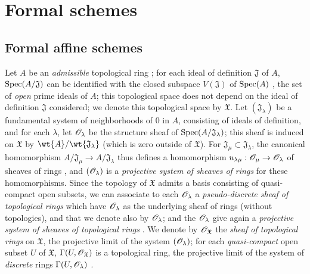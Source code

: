 \section{Formal schemes}
\label{section:1.10}

\subsection{Formal affine schemes}
\label{subsection:1.10.1}

\begin{env}[10.1.1]
\label{1.10.1.1}
Let $A$ be an \emph{admissible} topological ring ; for each ideal of definition $\mathfrak{J}$ of $A$, $\operatorname{Spec}(A/\mathfrak{J})$ can be identified with the closed subspace $V(\mathfrak{J})$ of $\operatorname{Spec}(A)$ , the set of \emph{open} prime ideals of $A$; this topological space does not depend
on the ideal of definition $\mathfrak{J}$ considered; we denote this topological space by $\mathfrak{X}$. Let $(\mathfrak{J}_\lambda)$ be a fundamental system of neighborhoods of $0$ in $A$, consisting of ideals of definition, and for each $\lambda$, let $\mathscr{O}_\lambda$ be the structure sheaf of $\operatorname{Spec}(A/\mathfrak{J}_\lambda)$; this sheaf is induced on $\mathfrak{X}$ by $\wt{A}/\wt{\mathfrak{J}_\lambda}$ (which is zero outside of $\mathfrak{X}$).
For $\mathfrak{J}_\mu\subset\mathfrak{J}_\lambda$, the canonical homomorphism $A/\mathfrak{J}_\mu\to A/\mathfrak{J}_\lambda$ thus defines a homomorphism $u_{\lambda\mu}:\sh{O}_\mu\to\sh{O}_\lambda$ of sheaves of rings , and $(\mathscr{O}_\lambda)$ is a \emph{projective system of sheaves of rings} for these homomorphisms.
Since the topology of $\mathfrak{X}$ admits a basis consisting of quasi-compact open subsets, we can associate to each $\mathscr{O}_\lambda$ a \emph{pseudo-discrete sheaf of topological rings}  which have $\mathscr{O}_\lambda$ as the underlying sheaf of rings (without topologies), and that we denote also by $\mathscr{O}_\lambda$; and the $\mathscr{O}_\lambda$ give again a \emph{projective system of sheaves of topological rings} .
We denote by $\mathscr{O}_\mathfrak{X}$ the \emph{sheaf of topological rings} on $\mathfrak{X}$, the projective limit of the system $(\mathscr{O}_\lambda)$; for each \emph{quasi-compact} open subset $U$ of $\mathfrak{X}$, $\Gamma(U,\mathscr{O}_\mathfrak{X})$ is a topological ring, the projective limit of the system of \emph{discrete} rings $\Gamma(U,\mathscr{O}_\lambda)$ .
\end{env}

